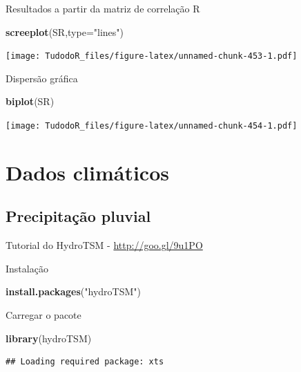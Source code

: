 \documentclass[
]{book}
\newenvironment{Shaded}{\begin{snugshade}}{\end{snugshade}}
\newcommand{\DataTypeTok}[1]{\textcolor[rgb]{0.13,0.29,0.53}{#1}}
\newcommand{\KeywordTok}[1]{\textcolor[rgb]{0.13,0.29,0.53}{\textbf{#1}}}
\newcommand{\NormalTok}[1]{#1}
\newcommand{\StringTok}[1]{\textcolor[rgb]{0.31,0.60,0.02}{#1}}
\begin{document}
Resultados a partir da matriz de correlação R

\begin{Shaded}
\begin{Highlighting}[]
\KeywordTok{screeplot}\NormalTok{(SR,}\DataTypeTok{type=}\StringTok{"lines"}\NormalTok{)}
\end{Highlighting}
\end{Shaded}

\texttt{[image: TudodoR\_files/figure-latex/unnamed-chunk-453-1.pdf]}

Dispersão gráfica

\begin{Shaded}
\begin{Highlighting}[]
\KeywordTok{biplot}\NormalTok{(SR)}
\end{Highlighting}
\end{Shaded}

\texttt{[image: TudodoR\_files/figure-latex/unnamed-chunk-454-1.pdf]}

\hypertarget{dados-climuxe1ticos-1}{%
\chapter{Dados climáticos}\label{dados-climuxe1ticos-1}}

\hypertarget{precipitauxe7uxe3o-pluvial}{%
\section{Precipitação pluvial}\label{precipitauxe7uxe3o-pluvial}}

Tutorial do HydroTSM - \url{http://goo.gl/9u1PO}

Instalação

\begin{Shaded}
\begin{Highlighting}[]
\KeywordTok{install.packages}\NormalTok{(}\StringTok{"hydroTSM"}\NormalTok{)}
\end{Highlighting}
\end{Shaded}

Carregar o pacote

\begin{Shaded}
\begin{Highlighting}[]
\KeywordTok{library}\NormalTok{(hydroTSM)}
\end{Highlighting}
\end{Shaded}

\begin{verbatim}
## Loading required package: xts
\end{verbatim}
\end{document}
